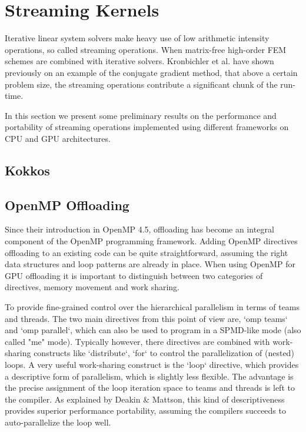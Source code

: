 \documentclass[a4paper,12pt]{article}
\begin{document}
\section{Streaming Kernels}

Iterative linear system solvers make heavy use of low arithmetic intensity operations, so called streaming operations.
When matrix-free high-order FEM schemes are combined with iterative solvers. 
Kronbichler et al. \cite{} have shown previously on an example of the conjugate gradient method, that above a certain problem size, the streaming operations contribute a significant chunk of the run-time.

In this section we present some preliminary results on the performance and portability of
streaming operations implemented using different frameworks on CPU and GPU architectures.

\subsection{Kokkos}



\subsection{OpenMP Offloading}

Since their introduction in OpenMP 4.5, offloading has become an integral component
of the OpenMP programming framework.
Adding OpenMP directives offloading to an existing code can be quite straightforward,
assuming the right data structures and loop patterns are already in place.
When using OpenMP for GPU offloading it is important to distinguish between two
categories of directives, memory movement and work sharing.

To provide fine-grained control over the hierarchical parallelism in terms of 
teams and threads. The two main directives from this point of view are, `omp teams` and `omp parallel`, which can also be used to program in a SPMD-like mode (also called "me" mode). Typically however, there directives are combined with work-sharing
constructs like `distribute`, `for` to control the parallelization of (nested) loops.
A very useful work-sharing construct is the `loop` directive, which provides 
a descriptive form of parallelism, which is slightly less flexible.
The advantage is the precise assignment of the loop iteration space to teams and threads is left to the compiler. 
As explained by Deakin \& Mattson, this kind of descriptiveness provides
superior performance portability, assuming the compilers succeeds to auto-parallelize
the loop well.
\end{document}
